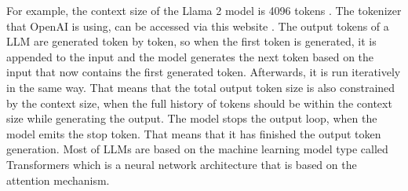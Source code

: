 \documentclass[draft,final]{thesisclass} %
\begin{document}
For example, the context size of the Llama 2 model is 4096 tokens \cite[47]{llama2}.
The tokenizer that OpenAI is using, can be accessed via this website \cite{openai_tokenizer}.
The output tokens of a \acs{LLM} are generated token by token, so when the first token is generated, it is appended to the input and the model generates the next token based on the input that now contains the first generated token. Afterwards, it is run iteratively in the same way.
That means that the total output token size is also constrained by the context size, when the full history of tokens should be within the context size while generating the output.
The model stops the output loop, when the model emits the stop token. That means that it has finished the output token generation.
Most of \acs{LLM}s are based on the machine learning model type called Transformers \cite[1]{transformer} which is a neural network architecture that is based on the attention mechanism.

\clearpage
\end{document}
